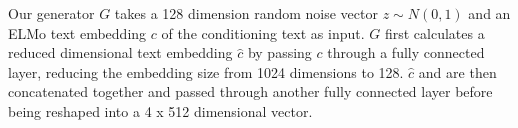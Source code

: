 Our generator $G$ takes a 128 dimension random noise vector $z \sim N(0, 1)$ and an ELMo text embedding $c$ of the conditioning text as input. $G$ first calculates a reduced dimensional text embedding $\hat{c}$ by passing $c$ through a fully connected layer, reducing the embedding size from 1024 dimensions to 128. $\hat{c}$ and  are then concatenated together and passed through another fully connected layer before being reshaped into a 4 x 512 dimensional vector.